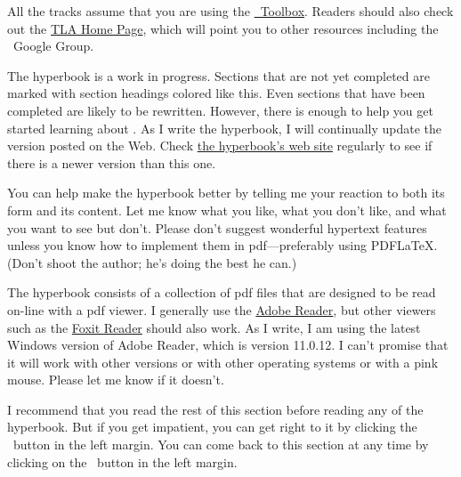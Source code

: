 \documentclass[fleqn,leqno]{article}
\begin{document}
All the tracks assume that you are using
the 
%
  \hyperref{http://research.microsoft.com/en-us/um/people/lamport/tla/toolbox.html}{}{}{\tlaplus\ Toolbox}.
%
Readers should also check out the 
  \hyperref{http://research.microsoft.com/en-us/um/people/lamport/tla/tla.html}{}{}{TLA Home Page}, which will point you to other resources including
the \tlaplus\ Google Group.


The hyperbook is a work in progress.  Sections that are not
yet completed are marked with section headings {\puce colored like
this}.  Even sections that have been completed are likely to be
rewritten.  However, there is enough to help you get started learning
about \tlaplus.  
%
As I write the hyperbook, I will continually update the version posted
on the Web.  
% 
%
Check 
  \hyperref{http://research.microsoft.com/en-us/um/people/lamport/tla/hyperbook.html}{}{}{the hyperbook's web site}
%
regularly to see if there is a newer version than this one.

You can help make the hyperbook better by telling me your reaction to
both its form and its content.  Let me know what you like, what you
don't like, and what you want to see but don't.  Please don't suggest
wonderful hypertext features unless you know how to implement them in
pdf---preferably using PDF\LaTeX. (Don't shoot the author; he's doing
the best he can.)

The hyperbook consists of a collection of pdf files that are designed
to be read on-line with a pdf viewer.  I generally use the
\hyperref{http://get.adobe.com/reader/}{}{}{Adobe Reader},
but other viewers such as the 
   \hyperref{http://www.foxitsoftware.com/Secure_PDF_Reader/}{}{}{Foxit Reader}
should also work.
As I write, I am using the latest Windows version of Adobe Reader,
which is version 11.0.12.  I can't promise that it will work with other
versions or with other operating systems or with a pink mouse.  Please
let me know if it doesn't.  

I recommend that you read the rest of this section before reading any
of the hyperbook.  But if you get impatient, you can get right to it
by clicking the \contentsbutton\ button in the left margin.  You can
come back to this section at any time by clicking on the \helpbutton\
button in the left margin.
\end{document}
